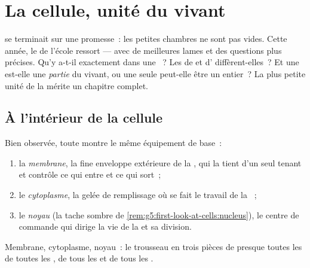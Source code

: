 \chapter{La cellule, unité du vivant}\label{ch:g6:cell-unit-of-life}

 se terminait sur une promesse~: les
petites chambres ne sont pas vides. Cette année, le  de
l'école ressort --- avec de meilleures lames et des questions plus
précises. Qu'y a-t-il exactement dans une ~? Les  de
 et d' diffèrent-elles~? Et une  est-elle une
\emph{partie} du vivant, ou une seule  peut-elle être un  entier~? La plus petite unité de la  mérite un
chapitre complet.

\section{À l'intérieur de la cellule}

\begin{definition}\label{def:g6:cell-unit-of-life:parts}
Bien observée, toute  montre le même équipement de base~:
\begin{enumerate}
  \item la \emph{membrane}, la fine enveloppe
        extérieure de la , qui la tient d'un seul tenant et
        contrôle ce qui entre et ce qui sort~;
  \item le \emph{cytoplasme}, la gelée de
        remplissage où se fait le travail de la ~;
  \item le \emph{noyau}
        (la tache sombre de
        \cref{rem:g5:first-look-at-cells:nucleus}), le centre de
        commande qui dirige la vie de la  et sa division.
\end{enumerate}
Membrane, cytoplasme, noyau~: le trousseau en trois pièces de
presque toutes les  de toutes les , de tous les
 et de tous les .
\end{definition}

